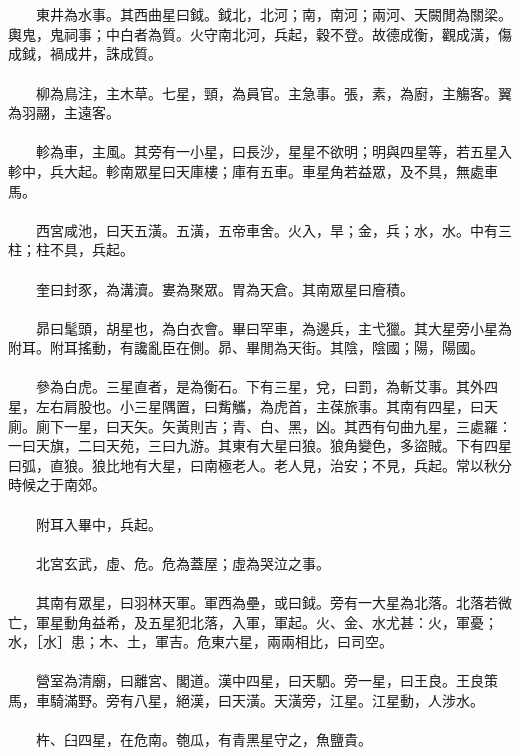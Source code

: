 \\\\
　　東井為水事。其西曲星曰鉞。鉞北，北河；南，南河；兩河、天闕閒為關梁。輿鬼，鬼祠事；中白者為質。火守南北河，兵起，穀不登。故德成衡，觀成潢，傷成鉞，禍成井，誅成質。
\\\\
　　柳為鳥注，主木草。七星，頸，為員官。主急事。張，素，為廚，主觴客。翼為羽翮，主遠客。
\\\\
　　軫為車，主風。其旁有一小星，曰長沙，星星不欲明；明與四星等，若五星入軫中，兵大起。軫南眾星曰天庫樓；庫有五車。車星角若益眾，及不具，無處車馬。
\\\\
　　西宮咸池，曰天五潢。五潢，五帝車舍。火入，旱；金，兵；水，水。中有三柱；柱不具，兵起。
\\\\
　　奎曰封豕，為溝瀆。婁為聚眾。胃為天倉。其南眾星曰廥積。
\\\\
　　昴曰髦頭，胡星也，為白衣會。畢曰罕車，為邊兵，主弋獵。其大星旁小星為附耳。附耳搖動，有讒亂臣在側。昴、畢閒為天街。其陰，陰國；陽，陽國。
\\\\
　　參為白虎。三星直者，是為衡石。下有三星，兌，曰罰，為斬艾事。其外四星，左右肩股也。小三星隅置，曰觜觿，為虎首，主葆旅事。其南有四星，曰天廁。廁下一星，曰天矢。矢黃則吉；青、白、黑，凶。其西有句曲九星，三處羅：一曰天旗，二曰天苑，三曰九游。其東有大星曰狼。狼角變色，多盜賊。下有四星曰弧，直狼。狼比地有大星，曰南極老人。老人見，治安；不見，兵起。常以秋分時候之于南郊。
\\\\
　　附耳入畢中，兵起。
\\\\
　　北宮玄武，虛、危。危為蓋屋；虛為哭泣之事。
\\\\
　　其南有眾星，曰羽林天軍。軍西為壘，或曰鉞。旁有一大星為北落。北落若微亡，軍星動角益希，及五星犯北落，入軍，軍起。火、金、水尤甚：火，軍憂；水，［水］患；木、土，軍吉。危東六星，兩兩相比，曰司空。
\\\\
　　營室為清廟，曰離宮、閣道。漢中四星，曰天駟。旁一星，曰王良。王良策馬，車騎滿野。旁有八星，絕漢，曰天潢。天潢旁，江星。江星動，人涉水。
\\\\
　　杵、臼四星，在危南。匏瓜，有青黑星守之，魚鹽貴。
\\\\
